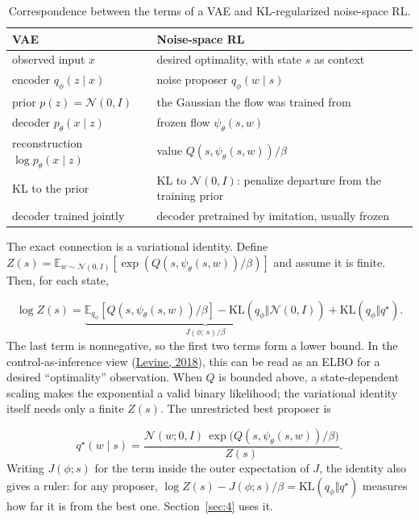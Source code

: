 \begin{table}[htbp]
\centering\small
\caption{Correspondence between the terms of a VAE and KL-regularized noise-space RL.}
\label{tab:vae}
\begin{tabularx}{\linewidth}{@{}>{\raggedright\arraybackslash}X>{\raggedright\arraybackslash}X@{}}
\toprule
VAE & Noise-space RL \\
\midrule
observed input $x$ & desired optimality, with state $s$ as context \\
encoder $q_\phi(z \mid x)$ & noise proposer $q_\phi(w \mid s)$ \\
prior $p(z) = \mathcal{N}(0, I)$ & the Gaussian the flow was trained from \\
decoder $p_\theta(x \mid z)$ & frozen flow $\psi_\theta(s, w)$ \\
reconstruction $\log p_\theta(x \mid z)$ & value $Q(s, \psi_\theta(s, w)) / \beta$ \\
KL to the prior & KL to $\mathcal{N}(0, I)$: penalize departure from the training prior \\
decoder trained jointly & decoder pretrained by imitation, usually frozen \\
\bottomrule
\end{tabularx}
\end{table}

The exact connection is a variational identity. Define $Z(s) = \mathbb{E}_{w \sim \mathcal{N}(0,I)}[\exp(Q(s, \psi_\theta(s,w))/\beta)]$ and assume it is finite. Then, for each state,

\begin{equation}
\log Z(s) = \underbrace{\mathbb{E}_{q_\phi}[Q(s, \psi_\theta(s,w))/\beta] - \mathrm{KL}(q_\phi \Vert \mathcal{N}(0,I))}_{J(\phi;\, s)/\beta} + \mathrm{KL}(q_\phi \Vert q^\star).
\end{equation}
The last term is nonnegative, so the first two terms form a lower bound. In the control-as-inference view (\hyperlink{ref:8}{Levine, 2018}), this can be read as an ELBO for a desired ``optimality'' observation. When $Q$ is bounded above, a state-dependent scaling makes the exponential a valid binary likelihood; the variational identity itself needs only a finite $Z(s)$. The unrestricted best proposer is

\begin{equation}
q^\star(w \mid s) = \frac{\mathcal{N}(w; 0, I)\, \exp\big(Q(s, \psi_\theta(s, w))/\beta\big)}{Z(s)}.
\end{equation}
Writing $J(\phi; s)$ for the term inside the outer expectation of $J$, the identity also gives a ruler: for any proposer, $\log Z(s) - J(\phi; s)/\beta = \mathrm{KL}(q_\phi \Vert q^\star)$ measures how far it is from the best one. Section~\ref{sec:4} uses it.

